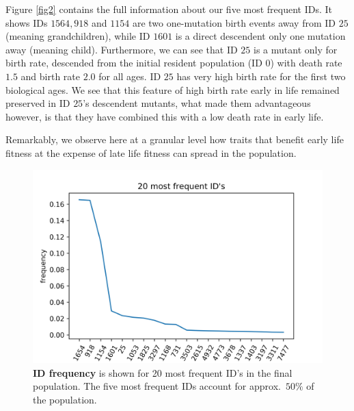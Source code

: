 \documentclass[11pt, a4paper]{article}
\theoremstyle{definition}
\begin{document}
\begin{appendices}
    Figure \ref{fig2} contains the full information about our five most frequent IDs. It shows IDs $1564, 918$ and $1154$ are two one-mutation birth events away from ID $25$ (meaning grandchildren), while  ID $1601$ is a direct descendent only one mutation away (meaning child). Furthermore, we can see that ID $25$ is a mutant only for birth rate, descended from the initial resident population (ID $0$) with death rate $1.5$ and birth rate $2.0$ for all ages. ID $25$ has very high birth rate for the first two
    biological ages. We see that this feature of high birth rate early in life remained preserved in ID $25$'s descendent mutants, what made them advantageous however, is that they have combined this with a low death rate in early life.

    Remarkably, we observe here at a granular level how traits that benefit early life fitness at the expense of late life fitness can spread in the population.

    \setcounter{figure}{0}
    \begin{figure}
        \center
        \includegraphics[scale=0.7]{figures/phylo1.png}
        \caption{\textbf{ID frequency} is shown for 20 most frequent ID's in the final population. The five most frequent IDs account for approx.\ $50\%$ of the population.}
        \label{fig1}
    \end{figure}


\end{appendices}
\end{document}
